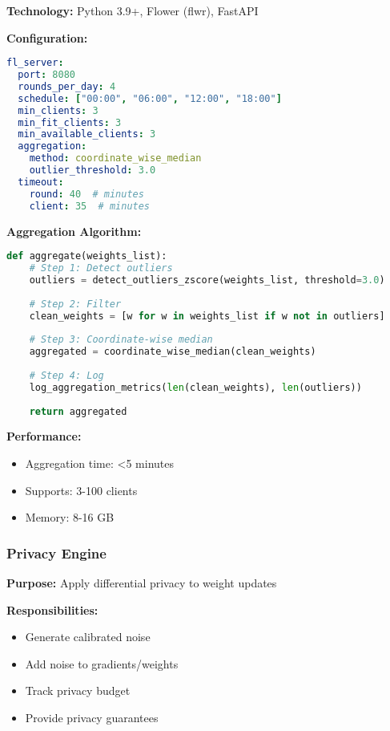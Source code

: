 \documentclass[12pt,a4paper]{article}
\begin{document}
\textbf{Technology:} Python 3.9+, Flower (flwr), FastAPI

\textbf{Configuration:}
\begin{lstlisting}[language=yaml]
fl_server:
  port: 8080
  rounds_per_day: 4
  schedule: ["00:00", "06:00", "12:00", "18:00"]
  min_clients: 3
  min_fit_clients: 3
  min_available_clients: 3
  aggregation:
    method: coordinate_wise_median
    outlier_threshold: 3.0
  timeout:
    round: 40  # minutes
    client: 35  # minutes
\end{lstlisting}

\textbf{Aggregation Algorithm:}
\begin{lstlisting}[language=python]
def aggregate(weights_list):
    # Step 1: Detect outliers
    outliers = detect_outliers_zscore(weights_list, threshold=3.0)
    
    # Step 2: Filter
    clean_weights = [w for w in weights_list if w not in outliers]
    
    # Step 3: Coordinate-wise median
    aggregated = coordinate_wise_median(clean_weights)
    
    # Step 4: Log
    log_aggregation_metrics(len(clean_weights), len(outliers))
    
    return aggregated
\end{lstlisting}

\textbf{Performance:}
\begin{itemize}[leftmargin=1cm,itemsep=0pt]
    \item Aggregation time: <5 minutes
    \item Supports: 3-100 clients
    \item Memory: 8-16 GB
\end{itemize}

\subsubsection{Privacy Engine}

\textbf{Purpose:} Apply differential privacy to weight updates

\textbf{Responsibilities:}
\begin{itemize}[leftmargin=1cm,itemsep=0pt]
    \item Generate calibrated noise
    \item Add noise to gradients/weights
    \item Track privacy budget
    \item Provide privacy guarantees
\end{itemize}
\end{document}
